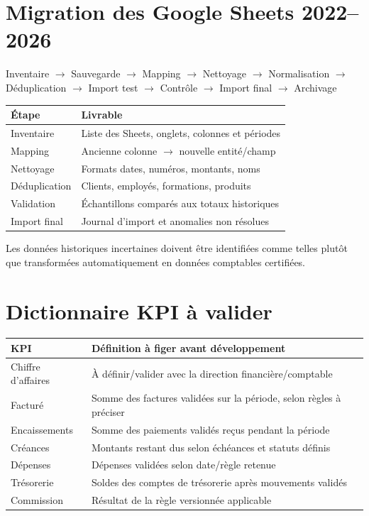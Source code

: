 \documentclass[11pt,a4paper]{article}
\newcommand{\tableheader}[2]{\textbf{#1} & \textbf{#2} \\ \hline}
\begin{document}
\section{Migration des Google Sheets 2022--2026}

Inventaire $\rightarrow$ Sauvegarde $\rightarrow$ Mapping $\rightarrow$ Nettoyage $\rightarrow$ Normalisation $\rightarrow$ Déduplication $\rightarrow$ Import test $\rightarrow$ Contrôle $\rightarrow$ Import final $\rightarrow$ Archivage

\begin{tabularx}{\textwidth}{|l|X|}
\hline
\tableheader{Étape}{Livrable}
Inventaire & Liste des Sheets, onglets, colonnes et périodes \\ \hline
Mapping & Ancienne colonne $\rightarrow$ nouvelle entité/champ \\ \hline
Nettoyage & Formats dates, numéros, montants, noms \\ \hline
Déduplication & Clients, employés, formations, produits \\ \hline
Validation & Échantillons comparés aux totaux historiques \\ \hline
Import final & Journal d'import et anomalies non résolues \\ \hline
\end{tabularx}

Les données historiques incertaines doivent être identifiées comme telles plutôt que transformées automatiquement en données comptables certifiées.

\section{Dictionnaire KPI à valider}

\begin{tabularx}{\textwidth}{|l|X|}
\hline
\tableheader{KPI}{Définition à figer avant développement}
Chiffre d'affaires & À définir/valider avec la direction financière/comptable \\ \hline
Facturé & Somme des factures validées sur la période, selon règles à préciser \\ \hline
Encaissements & Somme des paiements validés reçus pendant la période \\ \hline
Créances & Montants restant dus selon échéances et statuts définis \\ \hline
Dépenses & Dépenses validées selon date/règle retenue \\ \hline
Trésorerie & Soldes des comptes de trésorerie après mouvements validés \\ \hline
Commission & Résultat de la règle versionnée applicable \\ \hline
\end{tabularx}
\end{document}
